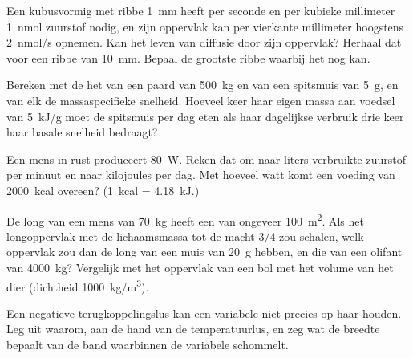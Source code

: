 \begin{exercise}[$\star\star$]\label{exo:b1:organism-environment:5}
Een kubusvormig  met ribbe \qty{1}{mm} heeft per seconde en per
kubieke millimeter \qty{1}{nmol} zuurstof nodig, en zijn oppervlak kan per
vierkante millimeter hoogstens \qty{2}{nmol/s} opnemen. Kan het leven van
diffusie door zijn oppervlak? Herhaal dat voor een ribbe van \qty{10}{mm}.
Bepaal de grootste ribbe waarbij het nog kan.
\end{exercise}

\begin{exercise}[$\star\star$]\label{exo:b1:organism-environment:6}
Bereken met de  het  van een paard van
\qty{500}{kg} en van een spitsmuis van \qty{5}{g}, en van elk de
massaspecifieke snelheid. Hoeveel keer haar eigen massa aan voedsel van
\qty{5}{kJ/g} moet de spitsmuis per dag eten als haar dagelijkse verbruik drie
keer haar basale snelheid bedraagt?
\end{exercise}

\begin{exercise}[$\star\star$]\label{exo:b1:organism-environment:7}
Een mens in rust produceert \qty{80}{W}. Reken dat om naar liters verbruikte
zuurstof per minuut en naar kilojoules per dag. Met hoeveel watt komt een
voeding van \qty{2000}{kcal} overeen? (\qty{1}{kcal} = \qty{4.18}{kJ}.)
\end{exercise}

\begin{exercise}[$\star\star$]\label{exo:b1:organism-environment:8}
De long van een mens van \qty{70}{kg} heeft een  van
ongeveer \qty{100}{m^2}. Als het longoppervlak met de lichaamsmassa tot de
macht $3/4$ zou schalen, welk oppervlak zou dan de long van een muis van
\qty{20}{g} hebben, en die van een olifant van \qty{4000}{kg}? Vergelijk met
het oppervlak van een bol met het volume van het dier (dichtheid
\qty{1000}{kg/m^3}).
\end{exercise}

\begin{exercise}[$\star\star$]\label{exo:b1:organism-environment:9}
Een negatieve-terugkoppelingslus kan een variabele niet precies op haar
 houden. Leg uit waarom, aan de hand van de temperatuurlus, en zeg
wat de breedte bepaalt van de band waarbinnen de variabele schommelt.
\end{exercise}

